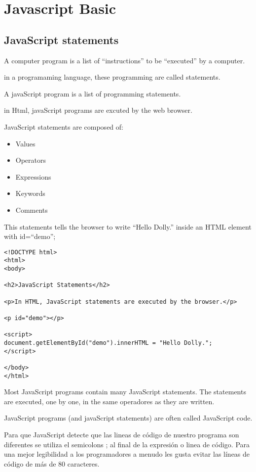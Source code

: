 \chapter{Javascript Basic}

\section{JavaScript statements}


A computer program is a list of ``instructions'' to be ``executed'' by a computer.

in a programaming language, these programming are called statements.

A javaScript program is a list of programming statements.

in Html, javaScript programs are excuted by the web browser. 

JavaScript statements are composed of: 

\begin{itemize}
    \item Values
    \item Operators
    \item Expressions
    \item Keywords
    \item Comments
\end{itemize}
This statements tells the browser to write ``Hello Dolly.'' inside an HTML element with id=``demo'';
\begin{verbatim}
<!DOCTYPE html>
<html>
<body>

<h2>JavaScript Statements</h2>

<p>In HTML, JavaScript statements are executed by the browser.</p>

<p id="demo"></p>

<script>
document.getElementById("demo").innerHTML = "Hello Dolly.";
</script>

</body>
</html>
\end{verbatim}
Most JavaScript programs contain many JavaScript statements. The statements are executed, one by one, in the same operadores
as they are written.

JavaScript programs (and javaScript statements) are often called JavaScript code.


Para que JavaScript detecte que las lineas de c\'odigo de nuestro programa son diferentes se utiliza el semicolons ;
al final de la expresi\'on o linea de c\'odigo. Para una mejor legibilidad a los programadores a menudo les gusta evitar las l\'ineas de c\'odigo de m\'as de 80 caracteres.


